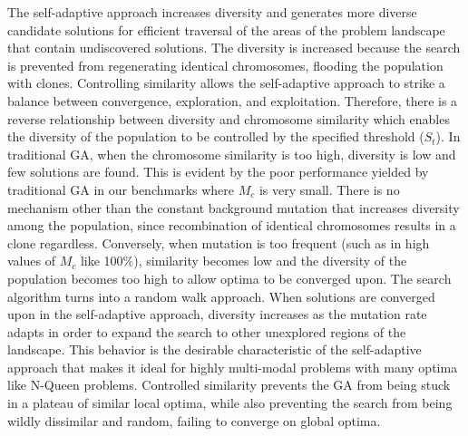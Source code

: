 \documentclass[conference]{IEEEtran}
\begin{document}
The self-adaptive approach increases diversity and generates more diverse candidate solutions for efficient traversal of the areas of the problem landscape that contain undiscovered solutions. The diversity is increased because the search is prevented from regenerating identical chromosomes, flooding the population with clones. Controlling similarity allows the self-adaptive approach to strike a balance between convergence, exploration, and exploitation. Therefore, there is a reverse relationship between diversity and chromosome similarity which enables the diversity of the population to be controlled by the specified threshold ($S_{t}$). In traditional GA, when the chromosome similarity is too high, diversity is low and few solutions are found. This is evident by the poor performance yielded by traditional GA in our benchmarks where $M_{c}$ is very small. There is no mechanism other than the constant background mutation that increases diversity among the population, since recombination of identical chromosomes results in a clone regardless. Conversely, when mutation is too frequent (such as in high values of $M_{c}$ like 100\%), similarity becomes low and the diversity of the population becomes too high to allow optima to be converged upon. The search algorithm turns into a random walk approach. When solutions are converged upon in the self-adaptive approach, diversity increases as the mutation rate adapts in order to expand the search to other unexplored regions of the landscape. This behavior is the desirable characteristic of the self-adaptive approach that makes it ideal for highly multi-modal problems with many optima like N-Queen problems. Controlled similarity prevents the GA from being stuck in a plateau of similar local optima, while also preventing the search from being wildly dissimilar and random, failing to converge on global optima.
\end{document}
